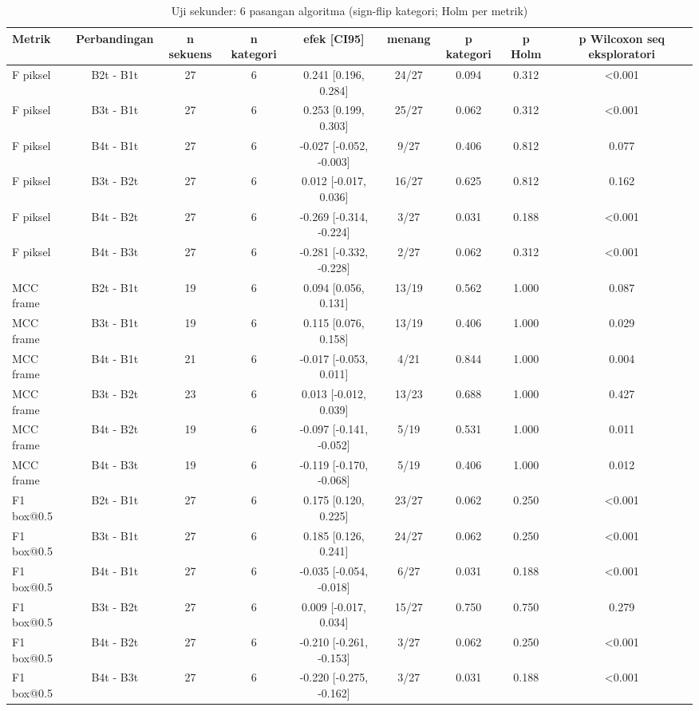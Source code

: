 \begin{table}[t]
\centering
\caption{Uji sekunder: 6 pasangan algoritma (sign-flip kategori; Holm per metrik)}
\label{tab:stats_secondary}
\begin{tabular}{lcccccccc}
\toprule
Metrik & Perbandingan & n sekuens & n kategori & efek [CI95] & menang & p kategori & p Holm & p Wilcoxon seq eksploratori \\
\midrule
F piksel & B2t - B1t & 27 & 6 & 0.241 [0.196, 0.284] & 24/27 & 0.094 & 0.312 & <0.001 \\
F piksel & B3t - B1t & 27 & 6 & 0.253 [0.199, 0.303] & 25/27 & 0.062 & 0.312 & <0.001 \\
F piksel & B4t - B1t & 27 & 6 & -0.027 [-0.052, -0.003] & 9/27 & 0.406 & 0.812 & 0.077 \\
F piksel & B3t - B2t & 27 & 6 & 0.012 [-0.017, 0.036] & 16/27 & 0.625 & 0.812 & 0.162 \\
F piksel & B4t - B2t & 27 & 6 & -0.269 [-0.314, -0.224] & 3/27 & 0.031 & 0.188 & <0.001 \\
F piksel & B4t - B3t & 27 & 6 & -0.281 [-0.332, -0.228] & 2/27 & 0.062 & 0.312 & <0.001 \\
MCC frame & B2t - B1t & 19 & 6 & 0.094 [0.056, 0.131] & 13/19 & 0.562 & 1.000 & 0.087 \\
MCC frame & B3t - B1t & 19 & 6 & 0.115 [0.076, 0.158] & 13/19 & 0.406 & 1.000 & 0.029 \\
MCC frame & B4t - B1t & 21 & 6 & -0.017 [-0.053, 0.011] & 4/21 & 0.844 & 1.000 & 0.004 \\
MCC frame & B3t - B2t & 23 & 6 & 0.013 [-0.012, 0.039] & 13/23 & 0.688 & 1.000 & 0.427 \\
MCC frame & B4t - B2t & 19 & 6 & -0.097 [-0.141, -0.052] & 5/19 & 0.531 & 1.000 & 0.011 \\
MCC frame & B4t - B3t & 19 & 6 & -0.119 [-0.170, -0.068] & 5/19 & 0.406 & 1.000 & 0.012 \\
F1 box@0.5 & B2t - B1t & 27 & 6 & 0.175 [0.120, 0.225] & 23/27 & 0.062 & 0.250 & <0.001 \\
F1 box@0.5 & B3t - B1t & 27 & 6 & 0.185 [0.126, 0.241] & 24/27 & 0.062 & 0.250 & <0.001 \\
F1 box@0.5 & B4t - B1t & 27 & 6 & -0.035 [-0.054, -0.018] & 6/27 & 0.031 & 0.188 & <0.001 \\
F1 box@0.5 & B3t - B2t & 27 & 6 & 0.009 [-0.017, 0.034] & 15/27 & 0.750 & 0.750 & 0.279 \\
F1 box@0.5 & B4t - B2t & 27 & 6 & -0.210 [-0.261, -0.153] & 3/27 & 0.062 & 0.250 & <0.001 \\
F1 box@0.5 & B4t - B3t & 27 & 6 & -0.220 [-0.275, -0.162] & 3/27 & 0.031 & 0.188 & <0.001 \\
\bottomrule
\end{tabular}
\end{table}
